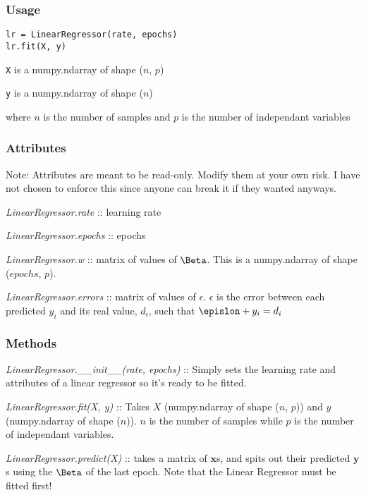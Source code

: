 \documentclass{article}
\begin{document}
\subsubsection{Usage}

\begin{verbatim}
lr = LinearRegressor(rate, epochs)
lr.fit(X, y)
\end{verbatim}

\texttt{X} is a numpy.ndarray of shape ($n$, $p$)

\texttt{y} is a numpy.ndarray of shape ($n$)

where $n$ is the number of samples and $p$ is the number of independant variables

\subsubsection{Attributes}

Note: Attributes are meant to be read-only. Modify them at your own risk. I have not chosen to enforce this since anyone can break it if they wanted anyways.

\textit{LinearRegressor.rate} :: learning rate

\textit{LinearRegressor.epochs} :: epochs

\textit{LinearRegressor.w} :: matrix of values of $\Beta$. This is a numpy.ndarray of shape ($epochs$, $p$).

\textit{LinearRegressor.errors} :: matrix of values of $\epsilon$. $\epsilon$ is the error between each predicted $y_i$ and its real value, $d_i$, such that $\epislon + y_i = d_i$

\subsubsection{Methods}

\textit{LinearRegressor.\_\_init\_\_(rate, epochs)} :: Simply sets the learning rate and attributes of a linear regressor so it's ready to be fitted.

\textit{LinearRegressor.fit(X, y)} :: Takes $X$ (numpy.ndarray of shape ($n$, $p$)) and $y$ (numpy.ndarray of shape ($n$)). $n$ is the number of samples while $p$ is the number of independant variables.

\textit{LinearRegressor.predict(X)} :: takes a matrix of $\mathbf{x}$s, and spits out their predicted $\textbf{y}$s using the $\Beta$ of the last epoch. Note that the Linear Regressor must be fitted first!
\end{document}
